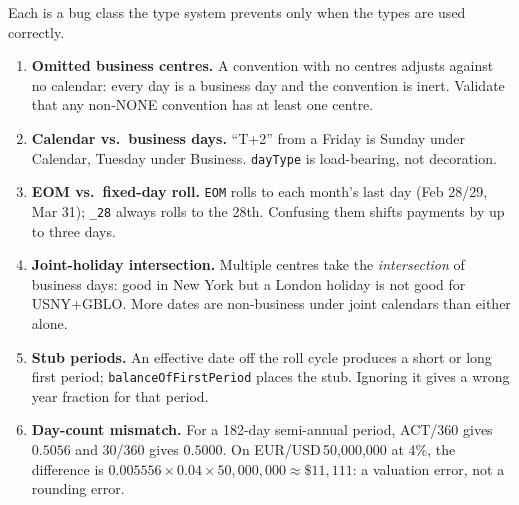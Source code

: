 Each is a bug class the type system prevents only when the types are used correctly.
\begin{enumerate}[nosep]
\item \textbf{Omitted business centres.} A convention with no centres adjusts against no calendar: every day is a business day and the convention is inert. Validate that any non-NONE convention has at least one centre.
\item \textbf{Calendar vs.\ business days.} ``T+2'' from a Friday is Sunday under Calendar, Tuesday under Business. \texttt{dayType} is load-bearing, not decoration.
\item \textbf{EOM vs.\ fixed-day roll.} \texttt{EOM} rolls to each month's last day (Feb 28/29, Mar 31); \texttt{\_28} always rolls to the 28th. Confusing them shifts payments by up to three days.
\item \textbf{Joint-holiday intersection.} Multiple centres take the \emph{intersection} of business days: good in New York but a London holiday is not good for USNY+GBLO. More dates are non-business under joint calendars than either alone.
\item \textbf{Stub periods.} An effective date off the roll cycle produces a short or long first period; \texttt{balanceOfFirstPeriod} places the stub. Ignoring it gives a wrong year fraction for that period.
\item \textbf{Day-count mismatch.} For a 182-day semi-annual period, ACT/360 gives $0.5056$ and 30/360 gives $0.5000$. On EUR/USD\,50{,}000{,}000 at 4\%, the difference is $0.005556\times0.04\times50{,}000{,}000\approx\$11{,}111$: a valuation error, not a rounding error.
\end{enumerate}

